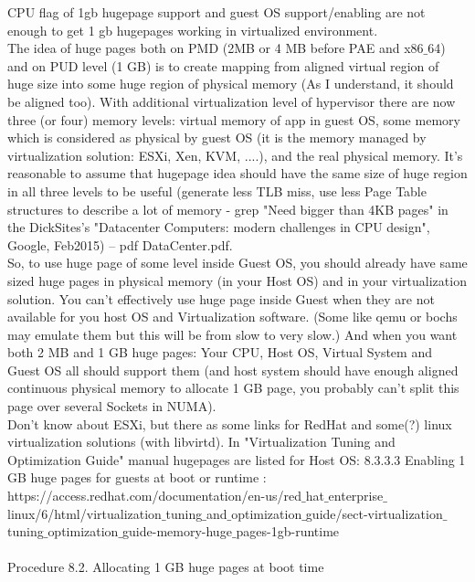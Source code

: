 \documentclass[11pt, a4paper, oneside]{article}
\theoremstyle{definition}
\begin{document}
CPU flag of 1gb hugepage support and guest OS support/enabling are not enough to get 1 gb hugepages working in virtualized environment.\\
The idea of huge pages both on PMD (2MB or 4 MB before PAE and x86$\_$64) and on PUD level (1 GB) is to create mapping from aligned virtual region of huge size into some huge region of physical memory (As I understand, it should be aligned too). With additional virtualization level of hypervisor there are now three (or four) memory levels: virtual memory of app in guest OS, some memory which is considered as physical by guest OS (it is the memory managed by virtualization solution: ESXi, Xen, KVM, ....), and the real physical memory. It's reasonable to assume that hugepage idea should have the same size of huge region in all three levels to be useful (generate less TLB miss, use less Page Table structures to describe a lot of memory - grep "Need bigger than 4KB pages" in the DickSites's "Datacenter Computers: modern challenges in CPU design", Google, Feb2015) -- pdf DataCenter.pdf.\\
So, to use huge page of some level inside Guest OS, you should already have same sized huge pages in physical memory (in your Host OS) and in your virtualization solution. You can't effectively use huge page inside Guest when they are not available for you host OS and Virtualization software. (Some like qemu or bochs may emulate them but this will be from slow to very slow.) And when you want both 2 MB and 1 GB huge pages: Your CPU, Host OS, Virtual System and Guest OS all should support them (and host system should have enough aligned continuous physical memory to allocate 1 GB page, you probably can't split this page over several Sockets in NUMA).\\
Don't know about ESXi, but there as some links for RedHat and some(?) linux virtualization solutions (with libvirtd). In "Virtualization Tuning and Optimization Guide" manual hugepages are listed for Host OS: 8.3.3.3 Enabling 1 GB huge pages for guests at boot or runtime :\\

https://access.redhat.com/documentation/en-us/red$\_$hat$\_$enterprise$\_$linux/6/html/virtualization$\_$tuning$\_$and$\_$optimization$\_$guide/sect-virtualization$\_$tuning$\_$optimization$\_$guide-memory-huge$\_$pages-1gb-runtime\\
\\
    Procedure 8.2. Allocating 1 GB huge pages at boot time\\
\end{document}
